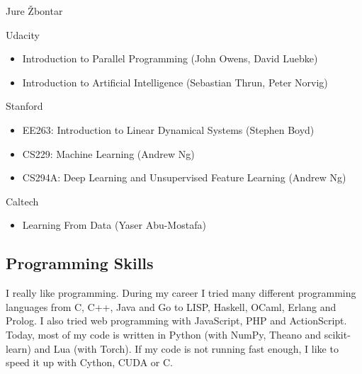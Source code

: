 \documentclass[12pt,a4paper]{article}
\begin{document}
\begin{cv}{Jure \v{Z}bontar}
\begin{cvlist}{}
\item[Udacity] 
\begin{itemize}
\item Introduction to Parallel Programming (John Owens, David Luebke)
\item Introduction to Artificial Intelligence (Sebastian Thrun, Peter Norvig)
\end{itemize}

\item[Stanford] 
\begin{itemize}
\item EE263: Introduction to Linear Dynamical Systems (Stephen Boyd)
\item CS229: Machine Learning (Andrew Ng)
\item CS294A: Deep Learning and Unsupervised Feature Learning (Andrew Ng)
\end{itemize}

\item[Caltech] 
\begin{itemize}
\item Learning From Data (Yaser Abu-Mostafa)
\end{itemize}

\end{cvlist}

\subsection*{Programming Skills}
I really like programming. During my career I tried many different
programming languages from C, C++, Java and Go to LISP, Haskell, OCaml,
Erlang and Prolog. I also tried web programming with JavaScript, PHP and
ActionScript. Today, most of my code is written in Python (with NumPy,
Theano and scikit-learn) and Lua (with Torch). If my code is not running fast enough,
I like to speed it up with Cython, CUDA or C.

\end{cv}
\end{document}
